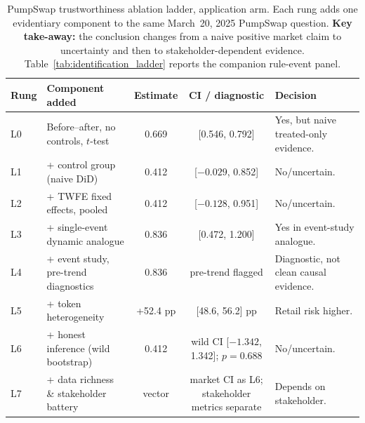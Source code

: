 \begin{table}[t]
  \caption{PumpSwap trustworthiness ablation ladder, application arm. Each
  rung adds one evidentiary component to the same March~20, 2025 PumpSwap
  question. \textbf{Key take-away:} the conclusion changes from a naive
  positive market claim to uncertainty and then to stakeholder-dependent
  evidence. Table~\ref{tab:identification_ladder} reports the companion rule-event panel.}
  \label{tab:ablation}
  \centering
  \footnotesize
  \setlength{\tabcolsep}{4pt}
  \begin{tabularx}{\textwidth}{@{}l >{\raggedright\arraybackslash}X c c >{\raggedright\arraybackslash}X@{}}
    \toprule
    \textbf{Rung} & \textbf{Component added} & \textbf{Estimate} &
    \textbf{CI / diagnostic} & \textbf{Decision} \\
    \midrule
    L0 & Before--after, no controls, $t$-test
      & 0.669 & [0.546, 0.792] & Yes, but naive treated-only evidence. \\
    L1 & + control group (naive DiD)
      & 0.412 & [$-0.029$, 0.852] & No/uncertain. \\
    L2 & + TWFE fixed effects, pooled
      & 0.412 & [$-0.128$, 0.951] & No/uncertain. \\
    L3 & + single-event dynamic analogue
      & 0.836 & [0.472, 1.200] & Yes in event-study analogue. \\
    L4 & + event study, pre-trend diagnostics
      & 0.836 & pre-trend flagged & Diagnostic, not clean causal evidence. \\
    L5 & + token heterogeneity
      & +52.4 pp & [48.6, 56.2] pp & Retail risk higher. \\
    L6 & + honest inference (wild bootstrap)
      & 0.412 & wild CI [$-1.342$, 1.342]; $p=0.688$ & No/uncertain. \\
    \rowcolor{okgreen!8}
    L7 & + data richness \& stakeholder battery
      & vector & market CI as L6; stakeholder metrics separate &
      Depends on stakeholder. \\
    \bottomrule
  \end{tabularx}
\end{table}
